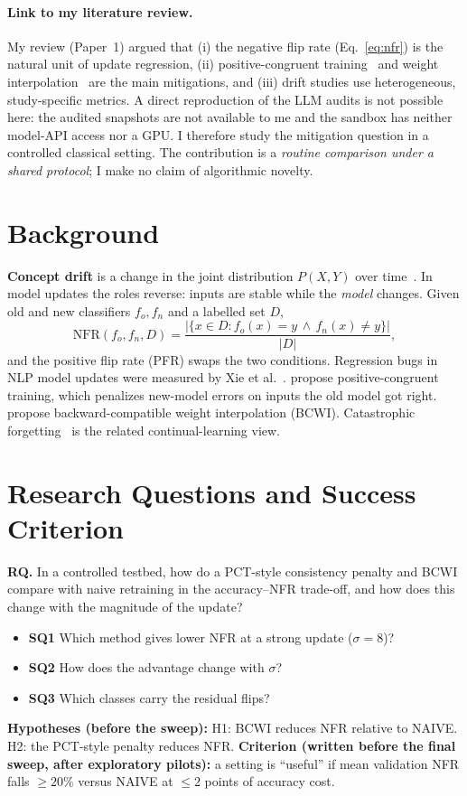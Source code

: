 \documentclass[acmsmall,screen]{acmart}
\begin{document}
\paragraph{Link to my literature review.} My review (Paper~1) argued that (i) the negative flip rate (Eq.~\ref{eq:nfr}) is the natural unit of update regression, (ii) positive-congruent training~\cite{yan2021positive} and weight interpolation~\cite{schumann2024backward} are the main mitigations, and (iii) drift studies use heterogeneous, study-specific metrics. A direct reproduction of the LLM audits is not possible here: the audited snapshots are not available to me and the sandbox has neither model-API access nor a GPU. I therefore study the mitigation question in a controlled classical setting. The contribution is a \emph{routine comparison under a shared protocol}; I make no claim of algorithmic novelty.

\section{Background}
\textbf{Concept drift} is a change in the joint distribution $P(X,Y)$ over time~\cite{gama2014survey}. In model updates the roles reverse: inputs are stable while the \emph{model} changes. Given old and new classifiers $f_o,f_n$ and a labelled set $D$,
\begin{equation}
\mathrm{NFR}(f_o,f_n,D)=\frac{|\{x\in D: f_o(x)=y\,\wedge\,f_n(x)\neq y\}|}{|D|},
\label{eq:nfr}
\end{equation}
and the positive flip rate (PFR) swaps the two conditions. Regression bugs in NLP model updates were measured by Xie et al.~\cite{xie2021regression}. \citet{yan2021positive} propose positive-congruent training, which penalizes new-model errors on inputs the old model got right. \citet{schumann2024backward} propose backward-compatible weight interpolation (BCWI). Catastrophic forgetting~\cite{kirkpatrick2017overcoming} is the related continual-learning view.

\section{Research Questions and Success Criterion}
\textbf{RQ.} In a controlled testbed, how do a PCT-style consistency penalty and BCWI compare with naive retraining in the accuracy--NFR trade-off, and how does this change with the magnitude of the update?
\begin{itemize}
\item \textbf{SQ1} Which method gives lower NFR at a strong update ($\sigma{=}8$)?
\item \textbf{SQ2} How does the advantage change with $\sigma$?
\item \textbf{SQ3} Which classes carry the residual flips?
\end{itemize}
\textbf{Hypotheses (before the sweep):} H1: BCWI reduces NFR relative to NAIVE. H2: the PCT-style penalty reduces NFR. \textbf{Criterion (written before the final sweep, after exploratory pilots):} a setting is ``useful'' if mean validation NFR falls $\ge 20\%$ versus NAIVE at $\le 2$ points of accuracy cost.
\end{document}
